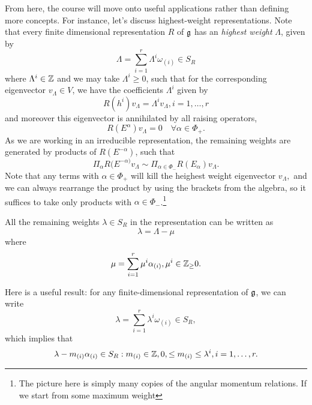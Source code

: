 From here, the course will move onto useful applications rather than defining more concepts. For instance, let's discuss highest-weight representations. Note that every finite dimensional representation $R$ of $\mathfrak{g}$ has an \emph{highest weight} $\Lambda$, given by
$$\Lambda=\sum_{i=1}^r \Lambda^i \omega_{(i)} \in S_R$$
where $\Lambda^i\in \mathbb{Z}$ and we may take $\Lambda^i\geq 0$, such that for the corresponding eigenvector $v_\Lambda \in V$, we have the coefficients $\Lambda^i$ given by
$$R(h^i)v_\Lambda = \Lambda^i v_\Lambda, i=1,\ldots,r$$
and moreover this eigenvector is annihilated by all raising operators,
$$R(E^\alpha)v_\Lambda=0 \quad\forall \alpha\in \Phi_+.$$
As we are working in an irreducible representation, the remaining weights are generated by products of $R(E^{-\alpha})$, such that
$$\Pi_{\alpha}R(E^{-\alpha)}v_\Lambda \sim \Pi_{\alpha\in \Phi_-}R(E_\alpha) v_\Lambda.$$
Note that any terms with $\alpha\in \Phi_+$ will kill the heighest weight eigenvector $v_\Lambda,$ and we can always rearrange the product by using the brackets from the algebra, so it suffices to take only products with $\alpha\in \Phi_-$.\footnote{The picture here is simply many copies of the angular momentum relations. If we start from some maximum weight}

All the remaining weights $\lambda\in S_R$ in the representation can be written as
$$\lambda=\Lambda-\mu$$
where $$\mu=\sum_{i=1}^r \mu^i \alpha_{(i)}, \mu^i \in \mathbb{Z}_\geq 0.$$

Here is a useful result: for any finite-dimensional representation of $\mathfrak{g}$, we can write
$$\lambda=\sum_{i=1}^r \lambda^i \omega_{(i)}\in S_R,$$
which implies that
$$\lambda-m_{(i)}\alpha_{(i)} \in S_R: m_{(i)}\in \mathbb{Z}, 0,\leq m_{(i)}\leq \lambda^i, i=1,\ldots,r.$$
